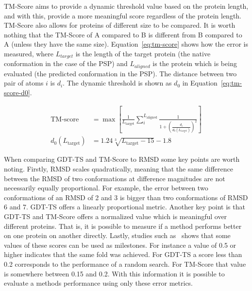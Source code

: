 \ac{TM-Score} aims to provide a dynamic threshold value based on the protein length, and with this, provide a more meaningful score regardless of the protein length. \ac{TM-Score} also allows for proteins of different size to be compared. It is worth nothing that the \ac{TM-Score} of A compared to B is different from B compared to A (unless they have the same size). Equation~\eqref{eq:tm-score} shows how the error is measured, where $L_{target}$ is the length of the target protein (the native conformation in the case of the \ac{PSP}) and $L_{aligned}$ is the protein which is being evaluated (the predicted conformation in the \ac{PSP}). The distance between two pair of atoms $i$ is $d_i$. The dynamic threshold is shown as $d_0$ in Equation~\eqref{eq:tm-score-d0}.


\begin{align}
    \text{TM-score}&=\max\left[ \frac{1}{L_\text{target}}\sum_i^{L_\text{aligned}}\frac{1}{1+\left(\frac{d_i}{d_0(L_\text{target})}\right)^2} \right] \label{eq:tm-score} \\
    d_0(L_\text{target})&=1.24\sqrt[3]{L_\text{target}-15}-1.8 \label{eq:tm-score-d0}
\end{align}

When comparing \ac{GDT-TS} and \ac{TM-Score} to \ac{RMSD} some key points are worth noting. Firstly, \ac{RMSD} scales quadratically, meaning that the same difference between the \ac{RMSD} of two conformations at difference magnitudes are not necessarily equally proportional. For example, the error between two conformations of an \ac{RMSD} of 2 and 3 is bigger than two conformations of \ac{RMSD} 6 and 7. \ac{GDT-TS} offers a linearly proportional metric. Another key point is that \ac{GDT-TS} and \ac{TM-Score} offers a normalized value which is meaningful over different proteins. That is, it is possible to measure if a method performs better on one protein on another directly. Lastly, studies such as~\cite{xu2010significant} shows that some values of these scores can be used as milestones. For instance a value of 0.5 or higher indicates that the same fold was achieved. For \ac{GDT-TS} a score less than 0.2 corresponds to the performance of a random search. For \ac{TM-Score} that value is somewhere between 0.15 and 0.2. With this information it is possible to evaluate a methods performance using only these error metrics.

